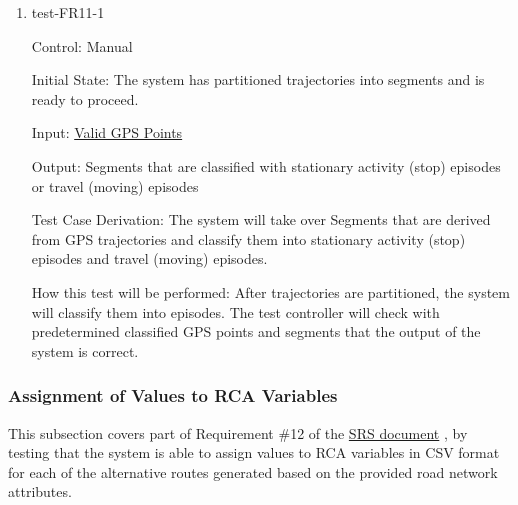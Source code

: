 \documentclass[12pt, titlepage]{article}
\begin{document}
\begin{enumerate}

\item{test-FR11-1\\} \label{test-FR11-1}

Control: Manual 
					
Initial State: The system has partitioned trajectories into segments and is ready to proceed.
					
Input: \href{https://github.com/paezha/PyERT-BLACK/blob/rev0-test/quarto-example/data/sample-gps/sample-gps-1.csv}{Valid GPS Points}
					
Output: Segments that are classified with stationary activity (stop) episodes or travel (moving) episodes 

Test Case Derivation: The system will take over Segments that are derived from GPS trajectories and classify them into stationary activity (stop) episodes and travel (moving) episodes.
					
How this test will be performed: After trajectories are partitioned, the system will classify them into episodes. The test controller will check with predetermined classified GPS points and segments that the output of the system is correct.

\end{enumerate}

\subsubsection{Assignment of Values to RCA Variables}

This subsection covers part of Requirement \#12 of the \href{https://github.com/paezha/PyERT-BLACK/blob/main/docs/SRS/SRS.pdf}{SRS document} \citep{SRS}, by testing that the system is able to assign values to RCA variables in CSV format for each of the alternative routes generated based on the provided road network attributes.
\end{document}
